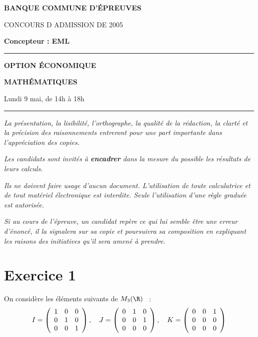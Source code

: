 \documentclass[11pt]{article}%
\begin{document}

\begin{center}
{\LARG\E\textbf{BANQUE COMMUNE D'ÉPREUVES}}



{\large \textsc{CONCOURS D ADMISSION DE 2005}}



{\large \textbf{Concepteur : EML}}



\rule{2.39cm}{0.05cm}



{\Large \textbf{OPTION ÉCONOMIQUE}}



{\Large \textbf{MATHÉMATIQUES }}



{\Large Lundi 9 mai, de 14h à 18h}



\rule{2.39cm}{0.05cm}
\end{center}

\textit{La présentation, la lisibilité, l'orthographe, la qualité
de la rédaction, la clarté et la précision des raisonnements
entreront pour une part importante dans l'appréciation des copies.}

\textit{Les candidats sont invités à \textbf{encadrer} dans la mesure
du possible les résultats de leurs calculs.}

\textit{Ils ne doivent faire usage d'aucun document. L'utilisation de
toute
calculatrice et de tout matériel électronique est interdite. Seule
l'utilisation d'une règle graduée est autorisée.}

\textit{Si au cours de l'épreuve, un candidat repère ce qui lui semble
être une erreur d'énoncé, il la signalera sur sa copie et
poursuivra sa composition en expliquant les raisons des initiatives
qu'il sera
amené à prendre.}

\vspace*{3cm}

\section*{Exercice 1}

On considère les éléments suivants de $M_{3}(\R)$~ :
\[
I = \left(
\begin{array}
[c]{ccc}1 & 0 & 0\\
0 & 1 & 0\\
0 & 0 & 1
\end{array}
\right),\quad J = \left(
\begin{array}
[c]{ccc}0 & 1 & 0\\
0 & 0 & 1\\
0 & 0 & 0
\end{array}
\right),\quad K = \left(
\begin{array}
[c]{ccc}0 & 0 & 1\\
0 & 0 & 0\\
0 & 0 & 0
\end{array}
\right)
\]
\end{document}
